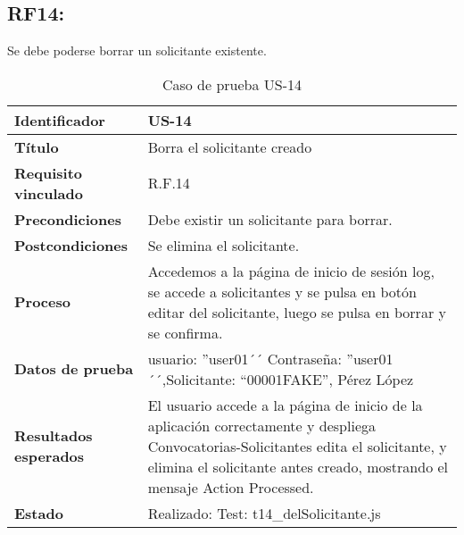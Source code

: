 \subsection{RF14:} Se debe poderse borrar un solicitante existente.
\begin{table}[H]
	\centering
	\renewcommand{\arraystretch}{1.3} 
	\begin{tabularx}{\textwidth}{|l|X|}
		\hline
		\textbf{Identificador} & US-14 \\
		\hline
		\textbf{Título} &Borra el solicitante creado\\
		\hline
		\textbf{Requisito vinculado} & R.F.14 \\
		\hline
		\textbf{Precondiciones} &  Debe existir un solicitante para borrar.\\
		\hline
		\textbf{Postcondiciones} & Se elimina el solicitante. \\
		\hline
		\textbf{Proceso} & Accedemos a la página de inicio de sesión log, se accede a solicitantes y se pulsa en botón editar del solicitante, luego se pulsa en borrar y se confirma.\\
		\hline
		\textbf{Datos de prueba} & usuario: ''user01´´ Contraseña: ''user01´´,Solicitante: “00001FAKE”, Pérez López
		\\
		\hline
		\textbf{Resultados esperados} & El usuario accede a la página de inicio de la aplicación correctamente y despliega Convocatorias-Solicitantes edita el solicitante, y elimina el solicitante antes creado, mostrando el mensaje Action Processed. \\
		\hline
		\textbf{Estado} & Realizado: Test: t14\_delSolicitante.js\\
		\hline
	\end{tabularx}
	\caption{Caso de prueba US-14}
	\label{tab:caso_uso14}
\end{table}

